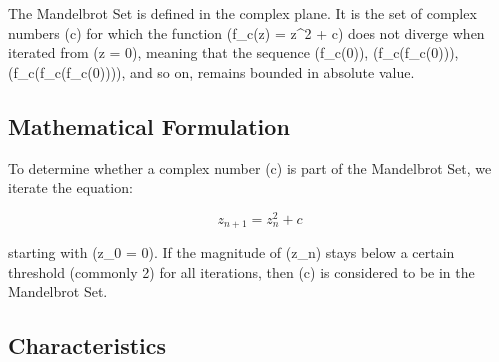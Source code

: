 \documentclass[
]{article}
\begin{document}
The Mandelbrot Set is defined in the complex plane. It is the set of
complex numbers (c) for which the function (f\_c(z) = z\^{}2 + c) does
not diverge when iterated from (z = 0), meaning that the sequence
(f\_c(0)), (f\_c(f\_c(0))), (f\_c(f\_c(f\_c(0)))), and so on, remains
bounded in absolute value.

\subsection{Mathematical Formulation}\label{mathematical-formulation}

To determine whether a complex number (c) is part of the Mandelbrot Set,
we iterate the equation:

\[ z_{n+1} = z_n^2 + c \]

starting with (z\_0 = 0). If the magnitude of (z\_n) stays below a
certain threshold (commonly 2) for all iterations, then (c) is
considered to be in the Mandelbrot Set.

\subsection{Characteristics}\label{characteristics}
\end{document}
